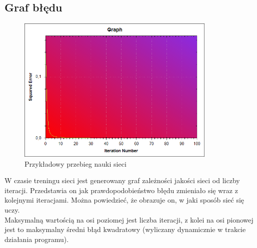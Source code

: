 \documentclass[a4paper]{article}
\begin{document}
			\subsection{Graf błędu}
				\begin{figure}[h!]
					\centering
					\includegraphics[width=0.85\textwidth]{./img/GUI_graph}
					\caption{Przykładowy przebieg nauki sieci}
				\end{figure}
				W czasie treningu sieci jest generowany graf zależności jakości sieci od liczby iteracji. Przedstawia on jak prawdopodobieństwo błędu zmieniało się wraz z kolejnymi iteracjami. Można powiedzieć, że obrazuje on, w jaki sposób sieć się uczy.\\
				Maksymalną wartością na osi poziomej jest liczba iteracji, z kolei na osi pionowej jest to maksymalny średni błąd kwadratowy (wyliczany dynamicznie w trakcie działania programu).
			
	
	
	
\end{document}

